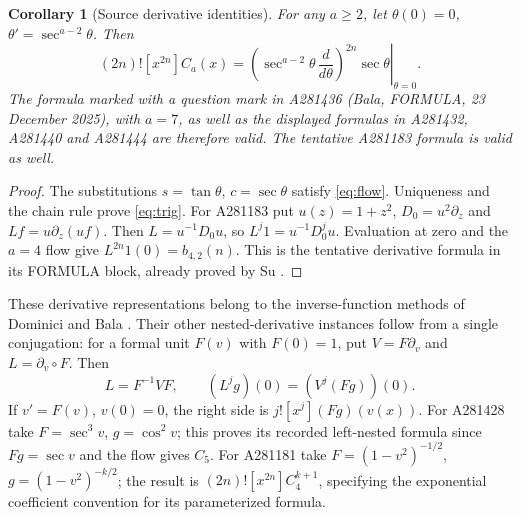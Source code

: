 \documentclass[11pt]{article}
\newtheorem{corollary}{Corollary}
\begin{document}
\begin{corollary}[Source derivative identities]\label{cor:derivatives}
For any $a\ge2$, let $\theta(0)=0$, $\theta'=\sec^{a-2}\theta$.
Then
\begin{equation}\label{eq:trig}
 (2n)![x^{2n}]C_a(x)
   =\left.\left(\sec^{a-2}\theta\,\frac d{d\theta}\right)^{2n}
       \sec\theta\right|_{\theta=0}.
\end{equation}
The formula marked with a question mark in A281436
(Bala, FORMULA, 23 December 2025), with $a=7$, as well as the displayed
formulas in A281432, A281440 and A281444 are therefore valid.
The tentative A281183 formula is valid as well.
\end{corollary}
\begin{proof}
The substitutions $s=\tan\theta$, $c=\sec\theta$ satisfy \eqref{eq:flow}.
Uniqueness and the chain rule prove \eqref{eq:trig}.
For A281183 put $u(z)=1+z^2$, $D_0=u^2\partial_z$ and
$L f=u\partial_z(uf)$. Then $L=u^{-1}D_0u$, so
$L^j1=u^{-1}D_0^ju$. Evaluation at zero and the $a=4$ flow give
$L^{2n}1(0)=b_{4,2}(n)$. This is the tentative derivative formula in
its FORMULA block, already proved by Su \cite[Proposition 3.5]{su}.
\end{proof}

These derivative representations belong to the inverse-function methods of
Dominici \cite[Theorem 4.1]{dominici} and Bala \cite[Corollary 1]{graves}.
Their other nested-derivative instances follow from a single conjugation:
for a formal unit $F(v)$ with $F(0)=1$, put $V=F\partial_v$ and
$L=\partial_v\circ F$. Then
\begin{equation}\label{eq:leftnested}
 L=F^{-1}VF,\qquad (L^jg)(0)=(V^j(Fg))(0).
\end{equation}
If $v'=F(v)$, $v(0)=0$, the right side is $j![x^j](Fg)(v(x))$.
For A281428 take $F=\sec^3v$, $g=\cos^2v$; this proves its recorded
left-nested formula since $Fg=\sec v$ and the flow gives $C_5$.
For A281181 take $F=(1-v^2)^{-1/2}$, $g=(1-v^2)^{-k/2}$;
the result is $(2n)![x^{2n}]C_4^{k+1}$, specifying the exponential
coefficient convention for its parameterized formula.
\end{document}
